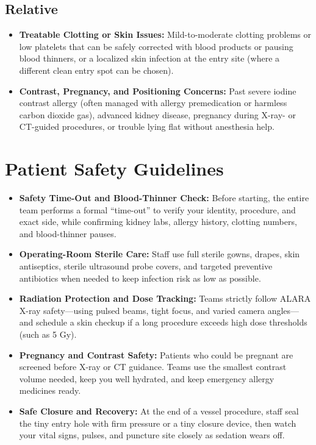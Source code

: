 \subsection{Relative}

\begin{itemize}
    \item \textbf{Treatable Clotting or Skin Issues:} Mild-to-moderate clotting problems or low platelets that can be safely corrected with blood products or pausing blood thinners, or a localized skin infection at the entry site (where a different clean entry spot can be chosen).
    \item \textbf{Contrast, Pregnancy, and Positioning Concerns:} Past severe iodine contrast allergy (often managed with allergy premedication or harmless carbon dioxide gas), advanced kidney disease, pregnancy during X-ray- or CT-guided procedures, or trouble lying flat without anesthesia help.
\end{itemize}

\section{Patient Safety Guidelines}

\begin{itemize}
    \item \textbf{Safety Time-Out and Blood-Thinner Check:} Before starting, the entire team performs a formal ``time-out'' to verify your identity, procedure, and exact side, while confirming kidney labs, allergy history, clotting numbers, and blood-thinner pauses.
    \item \textbf{Operating-Room Sterile Care:} Staff use full sterile gowns, drapes, skin antiseptics, sterile ultrasound probe covers, and targeted preventive antibiotics when needed to keep infection risk as low as possible.
    \item \textbf{Radiation Protection and Dose Tracking:} Teams strictly follow ALARA X-ray safety---using pulsed beams, tight focus, and varied camera angles---and schedule a skin checkup if a long procedure exceeds high dose thresholds (such as 5 Gy).
    \item \textbf{Pregnancy and Contrast Safety:} Patients who could be pregnant are screened before X-ray or CT guidance. Teams use the smallest contrast volume needed, keep you well hydrated, and keep emergency allergy medicines ready.
    \item \textbf{Safe Closure and Recovery:} At the end of a vessel procedure, staff seal the tiny entry hole with firm pressure or a tiny closure device, then watch your vital signs, pulses, and puncture site closely as sedation wears off.
\end{itemize}

